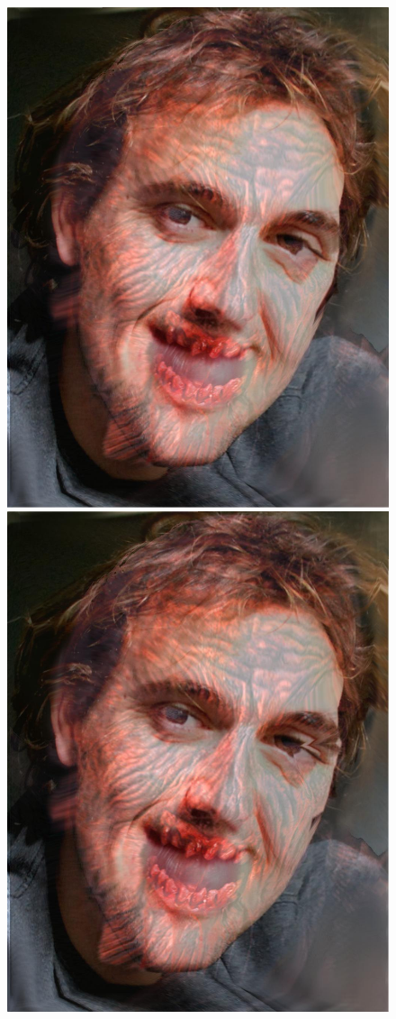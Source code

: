 \documentclass[11pt]{article}
\begin{document}
\begin{figure}[H]
\begin{center}
\includegraphics[scale=0.08]{figs/zombie/zombie_bf_09.jpg} 
\includegraphics[scale=0.08]{figs/zombie/zombie_bf_10.jpg} 

\end{center}
\end{figure}
\end{document}
